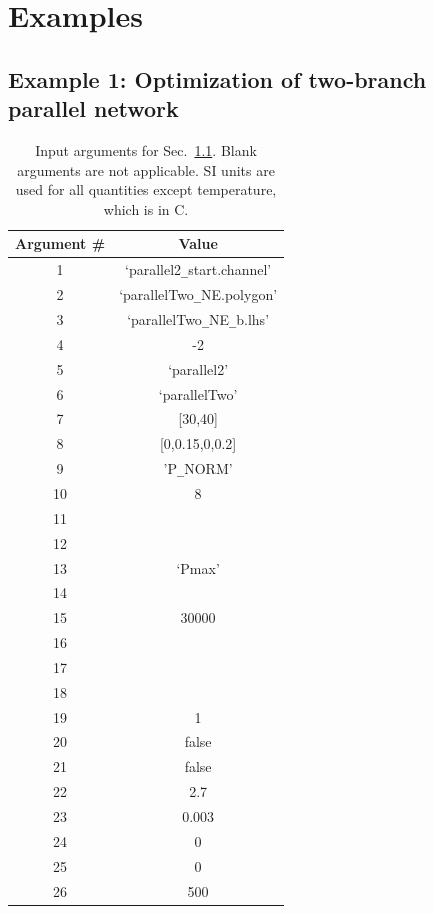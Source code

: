 \documentclass[11pt,letterpaper]{article}
\begin{document}
\section{Examples}
\subsection{Example 1: Optimization of two-branch parallel network}
\label{subsec_standard_parallelTwo}

\begin{table}[!h]
\caption{Input arguments for Sec.\ \ref{subsec_standard_parallelTwo}. Blank arguments are not applicable. SI units are used for all quantities except temperature, which is in \degree C. }
\label{tab_standard_parallelTwo_inputs1}
\centering
\begin{tabular}{|c|c|}
\hline
Argument \# & Value \\
\hline
1 & `parallel2\texttt{\_}start.channel' \\
\hline
2 & `parallelTwo\texttt{\_}NE.polygon' \\
\hline
3 & `parallelTwo\texttt{\_}NE\texttt{\_}b.lhs' \\  
\hline
4 & -2 \\
\hline
5 & `parallel2' \\
\hline
6 & `parallelTwo' \\
\hline
7 & [30,40] \\
\hline
8 & [0,0.15,0,0.2] \\
\hline
9 & 'P\texttt{\_}NORM' \\
\hline
10 & 8 \\
\hline
11 & \\
\hline
12 & \\
\hline
13 & `Pmax' \\
\hline
14 &  \\
\hline
15 & 30000 \\
\hline
16 &  \\
\hline
17 & \\
\hline
18 & \\
\hline
19 & 1 \\
\hline
20 & false \\
\hline
21 & false \\
\hline 
22 & 2.7 \\
\hline 
23 & 0.003 \\
\hline
24 & 0 \\
\hline 
25 & 0 \\
\hline
26 & 500 \\
\hline
\end{tabular}
\end{table}
\end{document}
